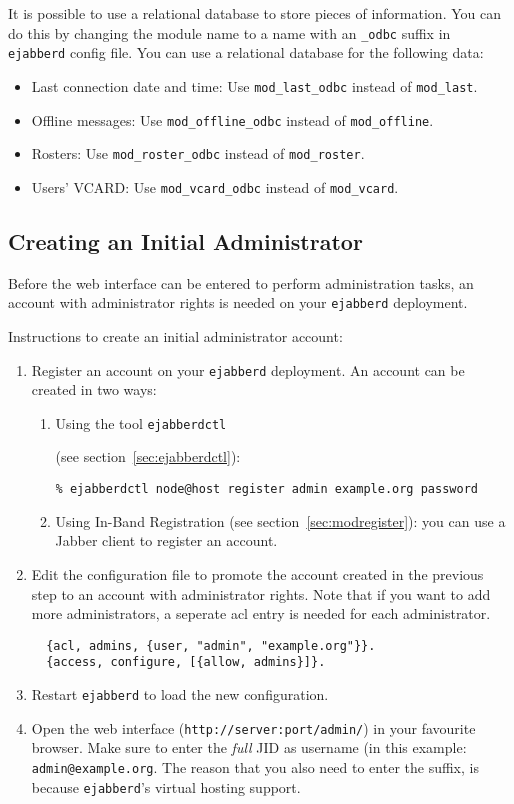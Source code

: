 \documentclass[a4paper,10pt]{article}
\newcommand{\ind}[1]{\begin{latexonly}\index{#1}\end{latexonly}}
\newcommand{\jid}[1]{\texttt{#1}}
\newcommand{\term}[1]{\texttt{#1}}
\newcommand{\ejabberd}{\texttt{ejabberd}}
\newcommand{\Jabber}{Jabber}
\begin{document}
It is possible to use a relational database to store pieces of
information. You can do this by changing the module name to a name with an
\term{\_odbc} suffix in \ejabberd{} config file. You can use a relational
database for the following data:

\begin{itemize}
\item Last connection date and time: Use \term{mod\_last\_odbc} instead of
  \term{mod\_last}.
\item Offline messages: Use \term{mod\_offline\_odbc} instead of
  \term{mod\_offline}.
\item Rosters: Use \term{mod\_roster\_odbc} instead of \term{mod\_roster}.
\item Users' VCARD: Use \term{mod\_vcard\_odbc} instead of \term{mod\_vcard}.
\end{itemize}

\subsection{Creating an Initial Administrator}
\label{sec:initialadmin}

Before the web interface can be entered to perform administration tasks, an
account with administrator rights is needed on your \ejabberd{} deployment.

Instructions to create an initial administrator account:
\begin{enumerate}
\item Register an account on your \ejabberd{} deployment. An account can be
  created in two ways:
  \begin{enumerate}
  \item Using the tool \term{ejabberdctl}\ind{ejabberdctl} (see
    section~\ref{sec:ejabberdctl}):
    \begin{verbatim}
% ejabberdctl node@host register admin example.org password
\end{verbatim} 
  \item Using In-Band Registration (see section~\ref{sec:modregister}): you can
    use a \Jabber{} client to register an account.
  \end{enumerate}
\item Edit the configuration file to promote the account created in the previous
  step to an account with administrator rights. Note that if you want to add
  more administrators, a seperate acl entry is needed for each administrator.
  \begin{verbatim}
  {acl, admins, {user, "admin", "example.org"}}.
  {access, configure, [{allow, admins}]}.
\end{verbatim} 
\item Restart \ejabberd{} to load the new configuration.
\item Open the web interface (\verb|http://server:port/admin/|) in your
  favourite browser. Make sure to enter the \emph{full} JID as username (in this
  example: \jid{admin@example.org}. The reason that you also need to enter the
  suffix, is because \ejabberd{}'s virtual hosting support.
\end{enumerate}
\end{document}

